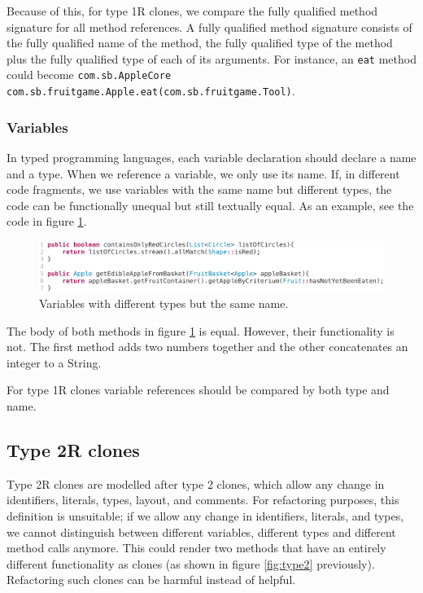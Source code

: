 Because of this, for type 1R clones, we compare the fully qualified method signature for all method references. A fully qualified method signature consists of the fully qualified name of the method, the fully qualified type of the method plus the fully qualified type of each of its arguments. For instance, an \texttt{eat} method could become \texttt{com.sb.AppleCore com.sb.fruitgame.Apple.eat(com.sb.fruitgame.Tool)}.

\subsubsection{Variables}
In typed programming languages, each variable declaration should declare a name and a type. When we reference a variable, we only use its name. If, in different code fragments, we use variables with the same name but different types, the code can be functionally unequal but still textually equal. As an example, see the code in figure \ref{fig:type2variables}.

\begin{figure}[H]
  \includegraphics[width=1\columnwidth]{img/type2}
  \caption{Variables with different types but the same name.}
  \label{fig:type2variables}
\end{figure}

The body of both methods in figure \ref{fig:type2variables} is equal. However, their functionality is not. The first method adds two numbers together and the other concatenates an integer to a String.

For type 1R clones variable references should be compared by both type and name.

\subsection{Type 2R clones} \label{sec:type2r}
Type 2R clones are modelled after type 2 clones, which allow any change in identifiers, literals, types, layout, and comments. For refactoring purposes, this definition is unsuitable; if we allow any change in identifiers, literals, and types, we cannot distinguish between different variables, different types and different method calls anymore. This could render two methods that have an entirely different functionality as clones (as shown in figure \ref{fig:type2} previously). Refactoring such clones can be harmful instead of helpful.

